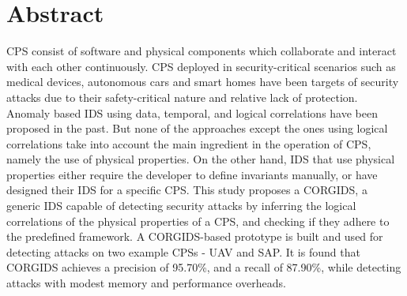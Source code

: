 
\chapter{Abstract}

\ac{CPS} consist of software and physical components which collaborate and interact with each other continuously. \ac{CPS} deployed in security-critical scenarios such as medical devices, autonomous cars and smart homes have been targets of security attacks due to their safety-critical nature and relative lack of protection. Anomaly based \ac{IDS} using data, temporal, and logical correlations have been proposed in the past. But none of the approaches except the ones using logical correlations take into account the main ingredient in the operation of \ac{CPS}, namely the use of physical properties. On the other hand, \ac{IDS} that use physical properties either require the developer to define invariants manually, or have designed their \ac{IDS} for a specific \ac{CPS}. This study proposes a \ac{CORGIDS}, a generic \ac{IDS} capable of detecting security attacks by inferring the logical correlations of the physical properties of a \ac{CPS}, and checking if they adhere to the predefined framework. A \ac{CORGIDS}-based prototype is built and used for detecting attacks on two example \ac{CPS}s - \ac{UAV} and \ac{SAP}. It is found that \ac{CORGIDS} achieves a precision of  95.70\%, and a recall of 87.90\%, while detecting attacks with modest memory and performance overheads.

